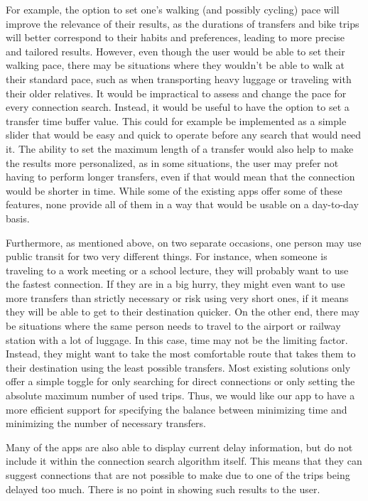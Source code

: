 For example, the option to set one's walking (and possibly cycling) pace will improve the relevance of their results, as the durations of transfers and bike trips will better correspond to their habits and preferences, leading to more precise and tailored results. However, even though the user would be able to set their walking pace, there may be situations where they wouldn't be able to walk at their standard pace, such as when transporting heavy luggage or traveling with their older relatives. It would be impractical to assess and change the pace for every connection search. Instead, it would be useful to have the option to set a transfer time buffer value. This could for example be implemented as a simple slider that would be easy and quick to operate before any search that would need it.
The ability to set the maximum length of a transfer would also help to make the results more personalized, as in some situations, the user may prefer not having to perform longer transfers, even if that would mean that the connection would be shorter in time.
While some of the existing apps offer some of these features, none provide all of them in a way that would be usable on a day-to-day basis.

Furthermore, as mentioned above, on two separate occasions, one person may use public transit for two very different things. For instance, when someone is traveling to a work meeting or a school lecture, they will probably want to use the fastest connection. If they are in a big hurry, they might even want to use more transfers than strictly necessary or risk using very short ones, if it means they will be able to get to their destination quicker. On the other end, there may be situations where the same person needs to travel to the airport or railway station with a lot of luggage. In this case, time may not be the limiting factor. Instead, they might want to take the most comfortable route that takes them to their destination using the least possible transfers. Most existing solutions only offer a simple toggle for only searching for direct connections or only setting the absolute maximum number of used trips. Thus, we would like our app to have a more efficient support for specifying the balance between minimizing time and minimizing the number of necessary transfers.

Many of the apps are also able to display current delay information, but do not include it within the connection search algorithm itself. This means that they can suggest connections that are not possible to make due to one of the trips being delayed too much. There is no point in showing such results to the user.

